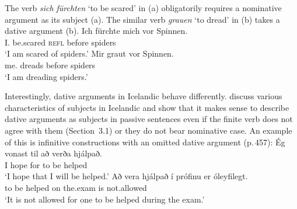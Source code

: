 \zl
The verb \emph{sich fürchten} `to be scared' in (a) obligatorily requires a nominative
argument as its subject (a). The similar verb \emph{grauen} `to dread' in (b)
takes a dative argument (b).
\eal
\ex
\gll Ich fürchte mich vor Spinnen.\\
     I.\nom{} be.scared \textsc{refl} before spiders\\
\glt `I am scared of spiders.'
\ex 
\gll Mir graut vor Spinnen.\\
     me.\dat{} dreads before spiders\\
\glt `I am dreading spiders.'
\zl

\noindent
Interestingly, dative arguments in Icelandic behave differently. \citet{ZMT85a} discuss various
characteristics of subjects in Icelandic and show that it makes sense to describe dative arguments as subjects in passive 
sentences even if the finite verb does not agree with them (Section~3.1) or they do not bear nominative case. An example of this
is infinitive constructions with an omitted dative argument (p.\,457):
\eal
\ex 
\gll Ég vonast til að verða hjálpað.\\
     I hope    for to be helped\\
\glt `I hope that I will be helped.'
\ex
\gll Að vera hjálpað í prófinu er óleyfilegt.\\
     to be helped on the.exam is not.allowed\\
\glt `It is not allowed for one to be helped during the exam.'
\zl

